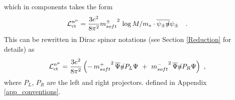 \documentclass[paper,12pt]{revtex4}
\newcommand{\slashed}[1]{\hbox{{$#1$}\llap{$/$}}}
\begin{document}
        which in components takes the form
\begin{equation}
	\mathcal{L}_{\rm ct}^{n^\mu} = 
	\frac{3e^2}
	     {8\pi^2} {m_{soft}^\pm}^2 \, \log M/m_s \cdot
	\overline{\psi_\pm \slashed{n}} \psi_\pm~~~.
\end{equation}
	This can be rewritten in Dirac spinor notations
	(see Section \ref{Reduction} for details) as
\begin{equation}
\label{SB_chiral_by_gauge}
	\mathcal{L}_{\rm ct}^{n^\mu} = 
	\frac{3e^2}
	     {8\pi^2}
	\left( -\, {m_{soft}^+}^2\, \overline{\Psi} \slashed{n}
			  	    P_L \Psi 
		~+~
		{m_{soft}^-}^2\, \overline{\Psi} \slashed{n}
				  P_R \Psi \right)~,
\end{equation}
	where $ P_L $, $ P_R $ are the left and right projectors. 
	defined in Appendix \ref{app_conventions}.
\end{document}
